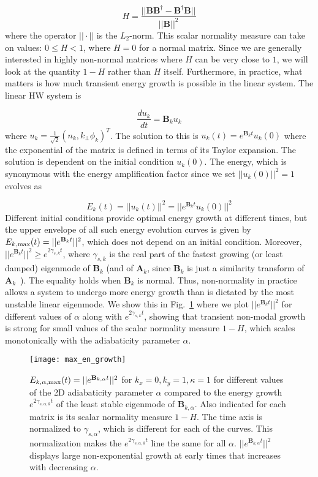 \documentclass[twocolumn,showkeys,superscriptaddress]{revtex4}
\def\beq{\begin{equation}}
\def\eeq{\end{equation}}
\newcommand{\diff}[2]{\frac{d#1}{d#2}}
\begin{document}
\beq
\label{henrici_num}
H = \frac{||\mathbf{B} \mathbf{B}^\dagger - \mathbf{B}^\dagger \mathbf{B}||}{|| \mathbf{B} ||^2}
\eeq
where the operator $|| \cdot ||$ is the $L_2$-norm. This scalar normality measure can take on values: $0 \le H < 1$, where $H=0$ for a normal matrix. Since we are generally interested in highly non-normal
matrices where $H$ can be very close to $1$, we will look at the quantity $1-H$ rather than $H$ itself. Furthermore, in practice, what matters is how much transient energy growth is possible in the linear
system. The linear HW system is

\beq
\label{lin_HW}
\diff{u_k}{t} = \mathbf{B}_k u_k
\eeq
where $u_k = \frac{1}{\sqrt{2}} \left( n_k, k_\perp \phi_k \right)^T$.
The solution to this is $u_k(t) = e^{\mathbf{B}_k t} u_k(0)$ where the exponential of the matrix is defined in terms of
its Taylor expansion. The solution is dependent on the initial condition $u_k(0)$.
The energy, which is synonymous with the energy amplification factor since we set $||u_k(0)||^2 =1$ evolves as

\beq
\label{Et}
E_k(t) = ||u_k(t)||^2 = ||e^{\mathbf{B}_k t} u_k(0)||^2
\eeq
Different initial conditions provide optimal energy growth at different times, but the upper envelope of all such energy evolution curves is given by
$E_{k,\rm{max}}(t) = ||e^{\mathbf{B}_k t}||^2$, which does not depend on an initial condition.
Moreover, $||e^{\mathbf{B}_k t}||^2 \ge e^{2 \gamma_{s,k} t}$, where $\gamma_{s,k}$ is the real part of
the fastest growing (or least damped) eigenmode of $\mathbf{B}_k$ (and of $\mathbf{A}_k$, since $\mathbf{B}_k$ is just a similarity transform of $\mathbf{A}_k$~\cite{camargo1998}). 
The equality holds when $\mathbf{B}_k$ is normal. 
Thus, non-normality in practice allows a system to undergo more energy growth than is dictated by the most unstable linear eigenmode. We show this in Fig.~\ref{max_en_growth} where we plot
$||e^{\mathbf{B}_k t}||^2$ for different values of $\alpha$ along with $e^{2 \gamma_{s,k} t}$, showing that transient non-modal growth is strong for small values of the scalar normality measure $1-H$, which scales monotonically
with the adiabaticity parameter $\alpha$.

\begin{figure}
\centerline{\texttt{[image: max\_en\_growth]}}
\caption{$E_{k,\alpha,\rm{max}}(t) = ||e^{\mathbf{B}_{k,\alpha} t}||^2$ for $k_x=0, k_y=1, \kappa=1$ for different values of the 2D adiabaticity parameter 
$\alpha$ compared to the energy growth $e^{2 \gamma_{s,\alpha,k} t}$ of the least stable eigenmode of  $\mathbf{B}_{k,\alpha}$. Also indicated for each matrix is its scalar normality measure $1-H$.
The time axis is normalized to $\gamma_{s,\alpha}$, which is different for each of the curves. This normalization makes the $e^{2 \gamma_{s,\alpha,k} t}$ line the same for all $\alpha$. 
$||e^{\mathbf{B}_{k,\alpha} t}||^2$ displays large non-exponential growth at early times that increases with decreasing $\alpha$.}
\label{max_en_growth}
\end{figure}
\end{document}
